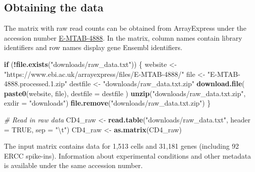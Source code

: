 \documentclass[9pt,a4paper,]{extarticle}
\newenvironment{Shaded}{\begin{snugshade}}{\end{snugshade}}
\newcommand{\CharTok}[1]{\textcolor[rgb]{0.31,0.60,0.02}{#1}}
\newcommand{\CommentTok}[1]{\textcolor[rgb]{0.56,0.35,0.01}{\textit{#1}}}
\newcommand{\ControlFlowTok}[1]{\textcolor[rgb]{0.13,0.29,0.53}{\textbf{#1}}}
\newcommand{\DataTypeTok}[1]{\textcolor[rgb]{0.13,0.29,0.53}{#1}}
\newcommand{\KeywordTok}[1]{\textcolor[rgb]{0.13,0.29,0.53}{\textbf{#1}}}
\newcommand{\NormalTok}[1]{#1}
\newcommand{\OperatorTok}[1]{\textcolor[rgb]{0.81,0.36,0.00}{\textbf{#1}}}
\newcommand{\OtherTok}[1]{\textcolor[rgb]{0.56,0.35,0.01}{#1}}
\newcommand{\StringTok}[1]{\textcolor[rgb]{0.31,0.60,0.02}{#1}}
\begin{document}
\hypertarget{obtaining-the-data}{%
\subsection{Obtaining the data}\label{obtaining-the-data}}

The matrix with raw read counts can be obtained from ArrayExpress under the
accession number
\href{https://www.ebi.ac.uk/arrayexpress/experiments/E-MTAB-4888/}{E-MTAB-4888}.
In the matrix, column names contain library identifiers and row names
display gene Ensembl identifiers.

\begin{Shaded}
\begin{Highlighting}[]
\ControlFlowTok{if}\NormalTok{ (}\OperatorTok{!}\KeywordTok{file.exists}\NormalTok{(}\StringTok{"downloads/raw_data.txt"}\NormalTok{)) \{}
\NormalTok{  website <-}\StringTok{ "https://www.ebi.ac.uk/arrayexpress/files/E-MTAB-4888/"}
\NormalTok{  file <-}\StringTok{ "E-MTAB-4888.processed.1.zip"}
\NormalTok{  destfile <-}\StringTok{ "downloads/raw_data.txt.zip"}
  \KeywordTok{download.file}\NormalTok{(}
    \KeywordTok{paste0}\NormalTok{(website, file),}
    \DataTypeTok{destfile =}\NormalTok{ destfile}
\NormalTok{  )}
  \KeywordTok{unzip}\NormalTok{(}\StringTok{"downloads/raw_data.txt.zip"}\NormalTok{, }\DataTypeTok{exdir =} \StringTok{"downloads"}\NormalTok{)}
  \KeywordTok{file.remove}\NormalTok{(}\StringTok{"downloads/raw_data.txt.zip"}\NormalTok{)}
\NormalTok{\}}

\CommentTok{# Read in raw data}
\NormalTok{CD4_raw <-}\StringTok{ }\KeywordTok{read.table}\NormalTok{(}\StringTok{"downloads/raw_data.txt"}\NormalTok{, }\DataTypeTok{header =} \OtherTok{TRUE}\NormalTok{, }\DataTypeTok{sep =} \StringTok{"}\CharTok{\textbackslash{}t}\StringTok{"}\NormalTok{)}
\NormalTok{CD4_raw <-}\StringTok{ }\KeywordTok{as.matrix}\NormalTok{(CD4_raw)}
\end{Highlighting}
\end{Shaded}

The input matrix contains data for 1,513
cells and 31,181
genes (including 92 ERCC spike-ins).
Information about experimental conditions and other metadata is available
under the same accession number.
\end{document}
